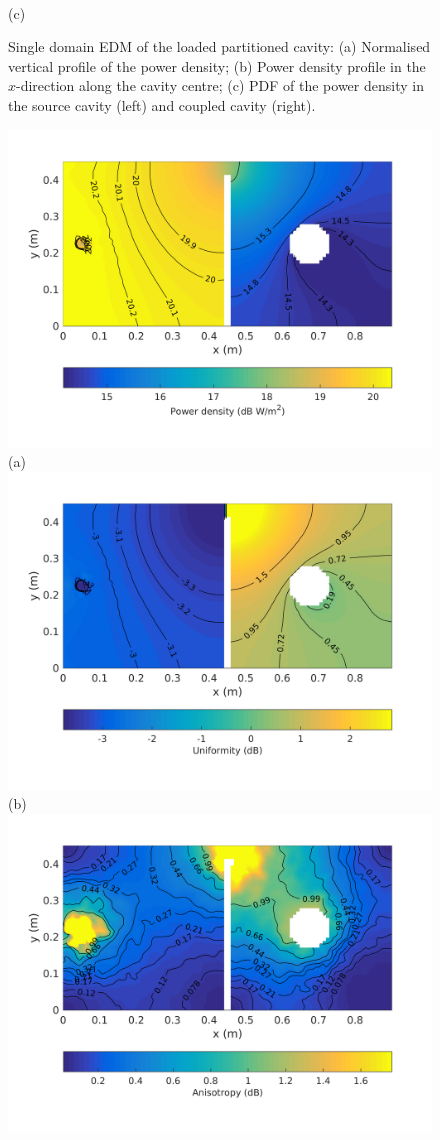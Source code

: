 \documentclass[a4paper]{article}
\numberwithin{equation}{section}
\begin{document}
\begin{figure}[hp]
\begin{center}
\\
{\footnotesize (c)}\\
\vspace{-2mm}
\caption{\label{fg:partcylsdm_profs} Single domain EDM of the loaded partitioned cavity: (a) Normalised vertical profile of the power density; 
(b) Power density profile in the $x$-direction along the cavity centre; (c) PDF of the power density in the source cavity (left) and coupled cavity (right).}
\end{center}
\end{figure}

\begin{figure}[hp]
\begin{center}
\includegraphics[trim={0 8mm 0 12mm},clip,width=0.52\linewidth]{figures/SDM_3D_DL_PowerDensityMap}\\
{\footnotesize (a)}\\
\vspace{2mm}
\includegraphics[trim={0 8mm 0 12mm},clip,width=0.52\linewidth]{figures/SDM_3D_DL_EnergyDensityUniformityMap}\\
{\footnotesize (b)}\\
\vspace{2mm}
\includegraphics[trim={0 8mm 0 12mm},clip,width=0.52\linewidth]{figures/SDM_3D_DL_EnergyDensityAnisotropyMap}\\

\end{center}
\end{figure}
\end{document}
